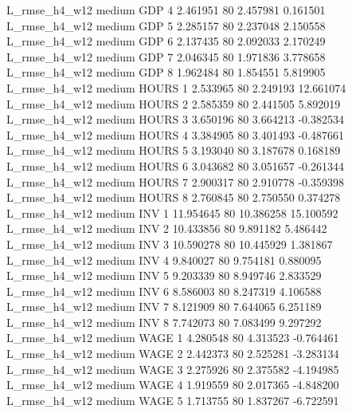  L_rmse_h4_w12     medium      GDP                 4  2.461951 80       2.457981           0.161501
 L_rmse_h4_w12     medium      GDP                 5  2.285157 80       2.237048           2.150558
 L_rmse_h4_w12     medium      GDP                 6  2.137435 80       2.092033           2.170249
 L_rmse_h4_w12     medium      GDP                 7  2.046345 80       1.971836           3.778658
 L_rmse_h4_w12     medium      GDP                 8  1.962484 80       1.854551           5.819905
 L_rmse_h4_w12     medium    HOURS                 1  2.533965 80       2.249193          12.661074
 L_rmse_h4_w12     medium    HOURS                 2  2.585359 80       2.441505           5.892019
 L_rmse_h4_w12     medium    HOURS                 3  3.650196 80       3.664213          -0.382534
 L_rmse_h4_w12     medium    HOURS                 4  3.384905 80       3.401493          -0.487661
 L_rmse_h4_w12     medium    HOURS                 5  3.193040 80       3.187678           0.168189
 L_rmse_h4_w12     medium    HOURS                 6  3.043682 80       3.051657          -0.261344
 L_rmse_h4_w12     medium    HOURS                 7  2.900317 80       2.910778          -0.359398
 L_rmse_h4_w12     medium    HOURS                 8  2.760845 80       2.750550           0.374278
 L_rmse_h4_w12     medium      INV                 1 11.954645 80      10.386258          15.100592
 L_rmse_h4_w12     medium      INV                 2 10.433856 80       9.891182           5.486442
 L_rmse_h4_w12     medium      INV                 3 10.590278 80      10.445929           1.381867
 L_rmse_h4_w12     medium      INV                 4  9.840027 80       9.754181           0.880095
 L_rmse_h4_w12     medium      INV                 5  9.203339 80       8.949746           2.833529
 L_rmse_h4_w12     medium      INV                 6  8.586003 80       8.247319           4.106588
 L_rmse_h4_w12     medium      INV                 7  8.121909 80       7.644065           6.251189
 L_rmse_h4_w12     medium      INV                 8  7.742073 80       7.083499           9.297292
 L_rmse_h4_w12     medium     WAGE                 1  4.280548 80       4.313523          -0.764461
 L_rmse_h4_w12     medium     WAGE                 2  2.442373 80       2.525281          -3.283134
 L_rmse_h4_w12     medium     WAGE                 3  2.275926 80       2.375582          -4.194985
 L_rmse_h4_w12     medium     WAGE                 4  1.919559 80       2.017365          -4.848200
 L_rmse_h4_w12     medium     WAGE                 5  1.713755 80       1.837267          -6.722591
